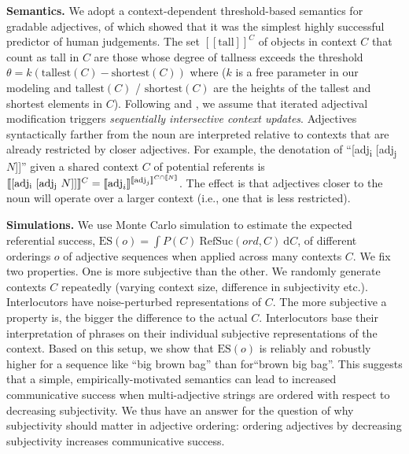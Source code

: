 \documentclass[12pt]{article}
\newcommand{\den}[1]{\ensuremath{[\![#1]\!]}}
\begin{document}
\noindent \textbf{Semantics.} We adopt a context-dependent threshold-based semantics for
gradable adjectives, of which \cite{schmidtetal2009} showed that it was the simplest highly
successful predictor of human judgements. The set $\den{\text{tall}}^C$ of objects in context
$C$ that count as tall in $C$ are those whose degree of tallness exceeds the threshold $\theta
= k(\text{tallest}(C) - \text{shortest}(C))$ where ($k$ is a free parameter in our modeling and
$\text{tallest}(C)$ / $\text{shortest}(C)$ are the heights of the tallest and shortest elements
in $C$). Following \cite{scontrasetalSPadjectives} and \cite{simonic2018}, we assume that
iterated adjectival modification triggers \emph{sequentially intersective context updates}.
Adjectives syntactically farther from the noun are interpreted relative to contexts that are
already restricted by closer adjectives. For example, the denotation of ``[adj\textsubscript{i}
[adj\textsubscript{j} $N$]]'' given a shared context $C$ of potential referents is
$\den{\text{[adj\textsubscript{i} [adj\textsubscript{j} $N$]]}}^{C} =
\den{\text{adj}_i}^{\den{\text{adj}_j}^{C\cap \den{N}}}$. The effect is that adjectives closer
to the noun will operate over a larger context (i.e., one that is less restricted).

\noindent \textbf{Simulations.} We use Monte Carlo simulation to estimate the expected
referential success, $\text{ES}(o) = \int P(C) \ \text{RefSuc}(ord,C) \ \text{d}C$, of
different orderings $o$ of adjective sequences when applied across many contexts $C$. We fix
two properties. One is more subjective than the other. We randomly generate contexts $C$
repeatedly (varying context size, difference in subjectivity etc.). Interlocutors have
noise-perturbed representations of $C$. The more subjective a property is, the bigger the
difference to the actual $C$. Interlocutors base their interpretation of phrases on their
individual subjective representations of the context. Based on this setup, we show that
$\text{ES}(o)$ is reliably and robustly higher for a sequence like ``big brown bag'' than
for``brown big bag''. This suggests that a simple, empirically-motivated semantics can lead to
increased communicative success when multi-adjective strings are ordered with respect to
decreasing subjectivity. We thus have an answer for the question of why subjectivity should
matter in adjective ordering: ordering adjectives by decreasing subjectivity increases
communicative success.

\printbibliography
\end{document}

